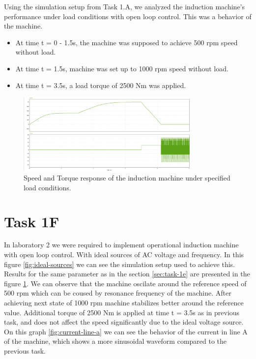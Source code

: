 \documentclass[12pt,a4paper]{report}
\begin{document}
Using the simulation setup from Task 1.A, we analyzed the induction machine's performance under load conditions with open loop control. This was a behavior of the machine.
\begin{itemize}
    \item At time t = 0 - 1.5s, the machine was supposed to achieve 500 rpm speed without load.
    \item At time t = 1.5s, machine was set up to 1000 rpm speed without load.
    \item At time t = 3.5s, a load torque of 2500 Nm was applied.
\end{itemize}

\begin{figure}[H]
    \centering
    \includegraphics[width=0.8\textwidth]{1ESimSpeedTorque.png}
    \caption{Speed and Torque response of the induction machine under specified load conditions.}
    \label{fig:speed-torque-response}
\end{figure}

\newpage
\section{Task 1F}
\label{Task 1F}
In laboratory 2 we were required to implement operational induction machine with open loop control.
With ideal sources of AC voltage and frequency. In this figure {\ref{fig:ideal-sources}} we can see the simulation setup used to achieve this.
Results for the same parameter as in the section \ref{sec:task-1e} are presented in the figure {\ref{fig:speed-torque-response}}.
We can observe that the machine oscilate around the reference speed of 500 rpm which can be coused by resonance frequency of the machine.
After achieving next state of 1000 rpm machine stabilizes better around the reference value.
Additional torque of 2500 Nm is applied at time t = 3.5s as in previous task, and does not affect the speed significantly due to the ideal voltage source.
On this graph {\ref{fig:current-line-a}} we can see the behavior of the current in line A of the machine, which shows a more sinusoidal waveform compared to the previous task.
\end{document}
